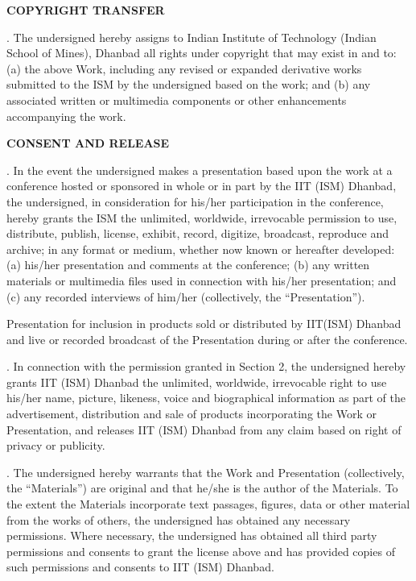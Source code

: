 \noindent
\textbf{COPYRIGHT TRANSFER}

\vspace{0.3cm}

. The undersigned hereby assigns to Indian Institute of Technology (Indian School of Mines), Dhanbad all rights under copyright that may exist in and to: (a) the above Work, including any revised or expanded derivative works submitted to the ISM by the undersigned based on the work; and (b) any associated written or multimedia components or other enhancements accompanying the work.







\clearpage
\thispagestyle{empty}
\noindent
\textbf{CONSENT AND RELEASE}

\vspace{0.3cm}

. In the event the undersigned makes a presentation based upon the work at a conference hosted or sponsored in whole or in part by the IIT (ISM) Dhanbad, the undersigned, in consideration for his/her participation in the conference, hereby grants the ISM the unlimited, worldwide, irrevocable permission to use, distribute, publish, license, exhibit, record, digitize, broadcast, reproduce and archive; in any format or medium, whether now known or hereafter developed: (a) his/her presentation and comments at the conference; (b) any written materials or multimedia files used in connection with his/her presentation; and (c) any recorded interviews of him/her (collectively, the ``Presentation'').

\noindent
Presentation for inclusion in products sold or distributed by IIT(ISM) Dhanbad and live or recorded broadcast of the Presentation during or after the conference.

\vspace{0.5cm}

. In connection with the permission granted in Section 2, the undersigned hereby grants IIT (ISM) Dhanbad the unlimited, worldwide, irrevocable right to use his/her name, picture, likeness, voice and biographical information as part of the advertisement, distribution and sale of products incorporating the Work or Presentation, and releases IIT (ISM) Dhanbad from any claim based on right of privacy or publicity.

\vspace{0.5cm}

. The undersigned hereby warrants that the Work and Presentation (collectively, the ``Materials'') are original and that he/she is the author of the Materials. To the extent the Materials incorporate text passages, figures, data or other material from the works of others, the undersigned has obtained any necessary permissions. Where necessary, the undersigned has obtained all third party permissions and consents to grant the license above and has provided copies of such permissions and consents to IIT (ISM) Dhanbad.









